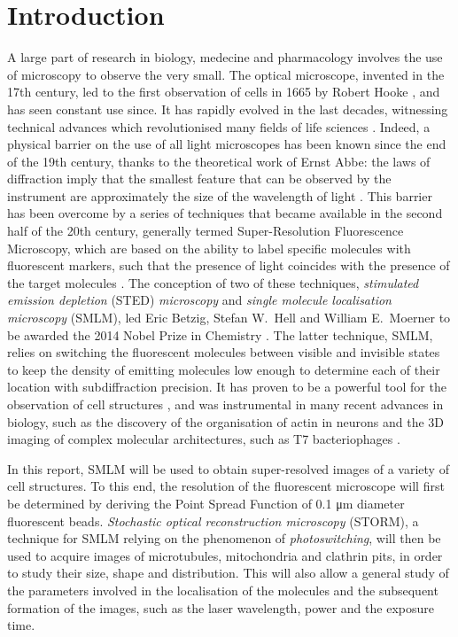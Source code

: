 \section{Introduction}
A large part of research in biology, medecine and pharmacology involves the use of microscopy to observe the very small.
The optical microscope, invented in the 17th century, led to the first observation of cells in 1665 by Robert Hooke \cite{reigoto_comparative_2021}, and has seen constant use since.
It has rapidly evolved in the last decades, witnessing technical advances which revolutionised many fields of life sciences \cite{balasubramanian_imagining_2023}.
Indeed, a physical barrier on the use of all light microscopes has been known since the end of the 19th century, thanks to the theoretical work of Ernst Abbe: the laws of diffraction imply that the smallest feature that can be observed by the instrument are approximately the size of the wavelength of light \cite{diaspro_fundamentals_2011}.
This barrier has been overcome by a series of techniques that became available in the second half of the 20th century, generally termed Super-Resolution Fluorescence Microscopy, which are based on the ability to label specific molecules with fluorescent markers, such that the presence of light coincides with the presence of the target molecules \cite{douglass_notice_2023}.
The conception of two of these techniques, \emph{stimulated emission depletion} (STED) \emph{microscopy} and \emph{single molecule localisation microscopy} (SMLM), led Eric Betzig, Stefan W.~Hell and William E.~Moerner to be awarded the 2014 Nobel Prize in Chemistry \cite{nobel_press_2014}.
The latter technique, SMLM, relies on switching the fluorescent molecules between visible and invisible states to keep the density of emitting molecules low enough to determine each of their location with subdiffraction precision.
It has proven to be a powerful tool for the observation of cell structures \cite{baddeley_biological_2018}, 
and was instrumental in many recent advances in biology, such as the discovery of the organisation of actin in neurons \cite{xu_actin_2013} and the 3D imaging of complex molecular architectures, such as T7 bacteriophages \cite{huang_ultra-high_2016}.

In this report, SMLM will be used to obtain super-resolved images of a variety of cell structures.
To this end, the resolution of the fluorescent microscope will first be determined by deriving the Point Spread Function of 0.1 \unit{\micro m} diameter fluorescent beads.
\emph{Stochastic optical reconstruction microscopy} (STORM), a technique for SMLM relying on the phenomenon of \emph{photoswitching}, will then be used to acquire images of microtubules, mitochondria and clathrin pits, in order to study their size, shape and distribution.
This will also allow a general study of the parameters involved in the localisation of the molecules and the subsequent formation of the images, such as the laser wavelength, power and the exposure time.